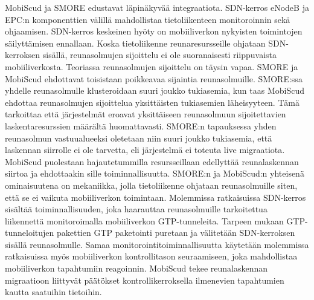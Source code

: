 MobiScud ja SMORE edustavat läpinäkyvää integraatiota.
SDN-kerros eNodeB ja EPC:n komponenttien välillä mahdollistaa tietoliikenteen monitoroinnin sekä ohjaamisen.
SDN-kerros keskeinen hyöty on mobiiliverkon nykyisten toimintojen säilyttämisen ennallaan.
Koska tietoliikenne reunaresursseille ohjataan SDN-kerroksen sisällä, reunasolmujen sijoittelu ei ole suoranaisesti riippuvaista mobiiliverkosta.  
Teoriassa reunasolmujen sijoittelu on täysin vapaa. 
SMORE ja MobiScud ehdottavat toisistaan poikkeavaa sijaintia reunasolmuille. SMORE:ssa yhdelle reunasolmulle klusteroidaan suuri joukko tukiasemia, kun taas MobiScud ehdottaa reunasolmujen sijoittelua yksittäisten tukiasemien läheisyyteen.
Tämä tarkoittaa että järjestelmät eroavat yksittäiseen reunasolmuun sijoitettavien laskentaresurssien määrältä huomattavasti.
SMORE:n tapauksessa yhden reunasolmun vastuualueeksi oletetaan niin suuri joukko tukiasemia, että laskennan siirrolle ei ole tarvetta, eli järjestelmä ei toteuta live migraatiota.
MobiScud puolestaan hajautetummilla resursseillaan edellyttää reunalaskennan siirtoa ja ehdottaakin sille toiminnallisuutta.
SMORE:n ja MobiScud:n yhteisenä ominaisuutena on mekaniikka, jolla tietoliikenne ohjataan reunasolmuille siten, että se ei vaikuta mobiiliverkon toimintaan.
Molemmissa ratkaisuissa SDN-kerros sisältää toiminnallisuuden, joka haarauttaa reunasolmuille tarkoitettua liikennettä monitoroimalla mobiiliverkon GTP-tunneleita.
Tarpeen mukaan GTP-tunneloitujen pakettien GTP paketointi puretaan ja välitetään SDN-kerroksen sisällä reunasolmulle. 
Samaa monitorointitoiminnallisuutta käytetään molemmissa ratkaisuissa myös mobiiliverkon kontrollitason seuraamiseen, joka mahdollistaa mobiiliverkon tapahtumiin reagoinnin.
MobiScud tekee reunalaskennan migraatioon liittyvät päätökset kontrollikerroksella ilmenevien tapahtumien kautta saatuihin tietoihin.
%


